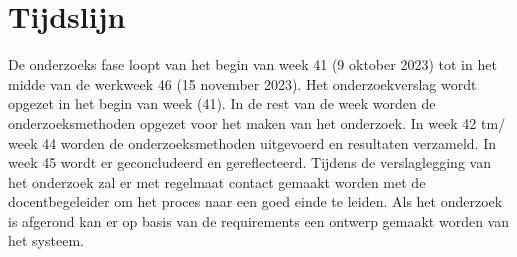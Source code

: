 \section{Tijdslijn}
De onderzoeks fase loopt van het begin van week 41 (9 oktober 2023) tot in het midde van de werkweek 46 (15 november 2023).
Het onderzoekverslag wordt opgezet in het begin van week (41).
In de rest van de week worden de onderzoeksmethoden opgezet voor het maken van het onderzoek.
In week 42 tm/ week 44 worden de onderzoeksmethoden uitgevoerd en resultaten verzameld.
In week 45 wordt er geconcludeerd en gereflecteerd.
Tijdens de verslaglegging van het onderzoek zal er met regelmaat contact gemaakt worden met de docentbegeleider om het proces naar een goed einde te leiden.
Als het onderzoek is afgerond kan er  op basis van de requirements een ontwerp gemaakt worden van het systeem.

